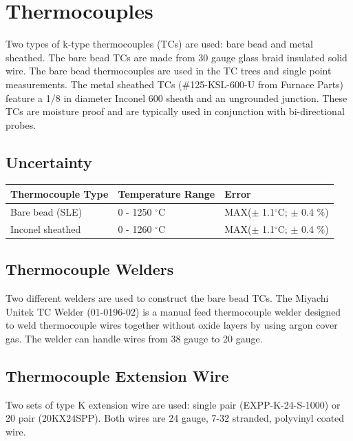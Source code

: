 \documentclass[11pt,oneside]{book}
\begin{document}
\chapter{Thermocouples}
\label{chap:thermocouple}

Two types of k-type thermocouples (TCs) are used: bare bead and metal sheathed. The bare bead TCs are made from 30 gauge glass braid insulated solid wire. The bare bead thermocouples are used in the TC trees and single point measurements. The metal sheathed TCs (\#125-KSL-600-U from Furnace Parts) feature a 1/8 in diameter Inconel 600 sheath and an ungrounded junction. These TCs are moisture proof and are typically used in conjunction with bi-directional probes. 

\section{Uncertainty}

\begin{table}[h!]
\centering
{}\label{tab:TC_uncertain}
\begin{tabular}{l l l}
\toprule[1.5pt]
Thermocouple Type & Temperature Range & Error  \\
\midrule
Bare bead (SLE)     & 0 - 1250 $^{\circ}$C &  MAX($\pm$ 1.1$^{\circ}$C; $\pm$ 0.4 $\%$)  \\ 
Inconel sheathed    & 0 - 1260 $^{\circ}$C &  MAX($\pm$ 1.1$^{\circ}$C; $\pm$ 0.4 $\%$)   \\ 
\bottomrule[1.25pt]
\end{tabular}\par
\end{table}

\section{Thermocouple Welders}

Two different welders are used to construct the bare bead TCs. The Miyachi Unitek TC Welder (01-0196-02) is a manual feed thermocouple welder designed to weld thermocouple wires together without oxide layers by using argon cover gas. The welder can handle wires from 38 gauge to 20 gauge. 

\section{Thermocouple Extension Wire}

Two sets of type K extension wire are used: single pair (EXPP-K-24-S-1000) or 20 pair (20KX24SPP). Both wires are 24 gauge, 7-32 stranded, polyvinyl coated wire.
\end{document}
